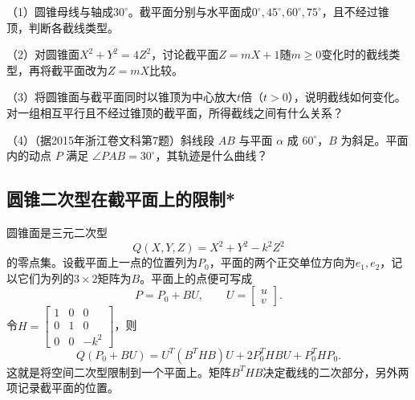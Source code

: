 \begin{exercise}
\mbox{}

\begin{samepage}
（1）圆锥母线与轴成\(30^\circ\)。截平面分别与水平面成\(0^\circ,45^\circ,60^\circ,75^\circ\)，且不经过锥顶，判断各截线类型。
\par
\end{samepage}

\begin{samepage}
（2）对圆锥面\(X^2+Y^2=4Z^2\)，讨论截平面\(Z=mX+1\)随\(m\ge0\)变化时的截线类型，再将截平面改为\(Z=mX\)比较。
\par
\end{samepage}

\begin{samepage}
（3）将圆锥面与截平面同时以锥顶为中心放大\(t\)倍（\(t>0\)），说明截线如何变化。对一组相互平行且不经过锥顶的截平面，所得截线之间有什么关系？
\par
\end{samepage}
\begin{samepage}
（4）（据2015年浙江卷文科第7题）斜线段 \(AB\) 与平面 \(\alpha\) 成 \(60^\circ\)，\(B\) 为斜足。平面内的动点 \(P\) 满足 \(\angle PAB=30^\circ\)，其轨迹是什么曲线？
\par\end{samepage}
\end{exercise}

\subsection{圆锥二次型在截平面上的限制*}
\label{subsec:quadratic-restricted-quadratic-forms}

圆锥面是三元二次型
\begin{equation*}
    Q(X,Y,Z)=X^2+Y^2-k^2Z^2
\end{equation*}
的零点集。设截平面上一点的位置列为\(P_0\)，平面的两个正交单位方向为\(e_1,e_2\)，记以它们为列的\(3\times2\)矩阵为\(B\)。平面上的点便可写成
\begin{equation*}
    P=P_0+BU , \qquad U=\left[\begin{matrix}u\\v\end{matrix}\right] .
\end{equation*}
令\(H=\left[\begin{smallmatrix}1&0&0\\0&1&0\\0&0&-k^2\end{smallmatrix}\right]\)，则
\begin{equation}\label{eq:quadratic-cone-restriction}
    Q(P_0+BU)=U^T(B^THB)U+2P_0^THBU+P_0^THP_0 .
\end{equation}
这就是将空间二次型限制到一个平面上。矩阵\(B^THB\)决定截线的二次部分，另外两项记录截平面的位置。

